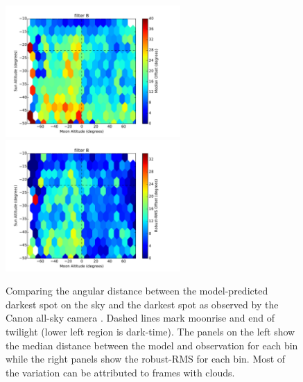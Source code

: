 \documentclass[]{spie}
\begin{document}
\begin{figure}
  \includegraphics[height=5cm]{plots/medianAngDiff_B_.pdf}\includegraphics[height=5cm]{plots/rmsAngDiff_B_.pdf}
  \caption{Comparing the angular distance between the model-predicted darkest spot on the sky and the darkest spot as observed by the Canon all-sky camera \label{fig:darkDir}.  Dashed lines mark moonrise and end of twilight (lower left region is dark-time).  The panels on the left show the median distance between the model and observation for each bin while the right panels show the robust-RMS for each bin.  Most of the variation can be attributed to frames with clouds.}
\end{figure}

\clearpage
\end{document}
